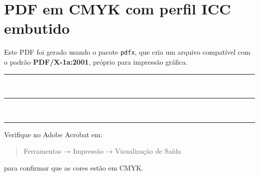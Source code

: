 \documentclass[a4paper,12pt]{article}
\begin{document}
\section*{PDF em CMYK com perfil ICC embutido}

Este PDF foi gerado usando o pacote \texttt{pdfx}, que cria um arquivo
compatível com o padrão \textbf{PDF/X-1a:2001}, próprio para impressão gráfica.

\vspace{1cm}

\textcolor{meuazul}{\rule{10cm}{1cm}}\\[4pt]
\textcolor{meuvermelho}{\rule{10cm}{1cm}}\\[4pt]
\textcolor{meupreto}{\rule{10cm}{1cm}}

\vspace{1cm}
Verifique no Adobe Acrobat em:
\begin{quote}
Ferramentas → Impressão → Visualização de Saída
\end{quote}
para confirmar que as cores estão em CMYK.
\end{document}
